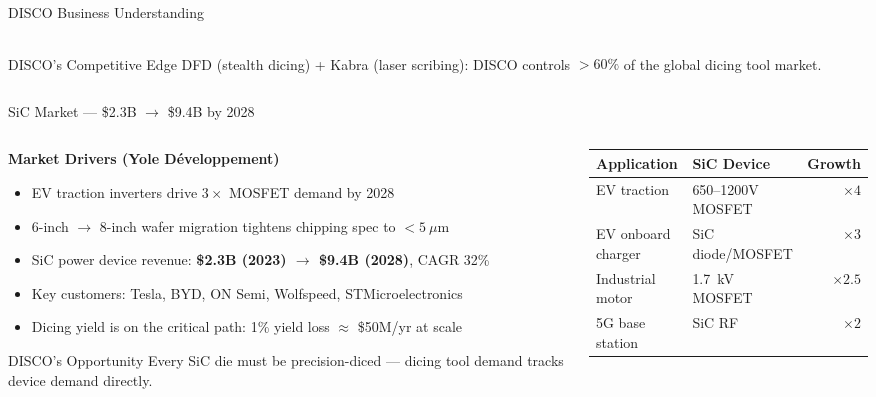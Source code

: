 \documentclass[aspectratio=169,11pt]{beamer}
\begin{document}
\begin{frame}[shrink=10]{DISCO Business Understanding}
\begin{columns}[T]
\begin{column}{0.46\textwidth}
      \vspace{0.7em}
      \begin{block}{DISCO's Competitive Edge}
        \small
        DFD\textsuperscript{\textregistered} (stealth dicing) +
        Kabra\textsuperscript{\textregistered} (laser scribing):
        DISCO controls $>60\%$ of the global dicing tool market.
      \end{block}
    \end{column}
  \end{columns}
\end{frame}

\begin{frame}[shrink=10]{SiC Market --- \$2.3B $\to$ \$9.4B by 2028}
  \begin{columns}[T]
    \begin{column}{0.52\textwidth}
      \textbf{Market Drivers (Yole D\'{e}veloppement)}
      \begin{itemize}
        \item EV traction inverters drive $3\times$ MOSFET demand by 2028
        \item 6-inch $\to$ 8-inch wafer migration tightens chipping spec
              to $<5~\mu$m
        \item SiC power device revenue:
              \textbf{\$2.3B (2023) $\to$ \$9.4B (2028)}, CAGR 32\%
        \item Key customers: Tesla, BYD, ON Semi, Wolfspeed,
              STMicroelectronics
        \item Dicing yield is on the critical path:
              1\% yield loss $\approx$ \$50M/yr at scale
      \end{itemize}

      \vspace{0.5em}
      \begin{block}{DISCO's Opportunity}
        \small
        Every SiC die must be precision-diced --- dicing tool
        demand tracks device demand directly.
      \end{block}
    \end{column}
    \begin{column}{0.44\textwidth}
      \centering
      \footnotesize
      \begin{tabular}{p{2.1cm}p{2.0cm}r}
        \toprule
        \textbf{Application} & \textbf{SiC Device} & \textbf{Growth} \\
        \midrule
        EV traction          & 650--1200V MOSFET   & $\times4$ \\
        EV onboard charger   & SiC diode/MOSFET    & $\times3$ \\
        Industrial motor     & 1.7~kV MOSFET       & $\times2.5$ \\
        5G base station      & SiC RF              & $\times2$ \\
        \bottomrule
      \end{tabular}


\end{column}
\end{columns}
\end{frame}
\end{document}
